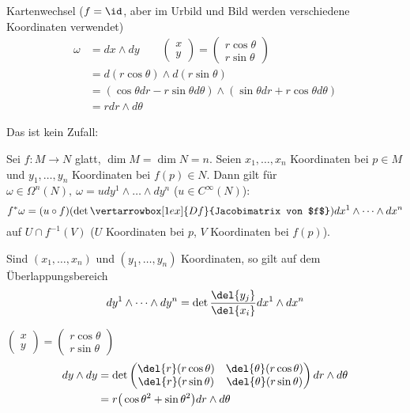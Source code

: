 \begin{exmp*}
	Kartenwechsel ($ f = \id $, aber im Urbild und Bild werden verschiedene Koordinaten verwendet)
	\begin{align*}
		\omega &= dx \wedge dy \qquad \begin{pmatrix}
			x\\y
		\end{pmatrix} = \begin{pmatrix}
		r\cos\theta\\r\sin\theta
	\end{pmatrix}\\
			&= d(r\cos\theta) \wedge d(r\sin\theta) \\
			&= (\cos\theta dr - r\sin \theta d \theta) \wedge (\sin\theta dr + r\cos\theta d \theta)\\
			&= rdr \wedge d\theta
	\end{align*}
\end{exmp*}

Das ist kein Zufall:

\begin{lem}
	Sei $ f: M \to N $ glatt, $ \dim M = \dim N = n $. Seien $ x_1,\dotsc,x_n $ Koordinaten bei $p \in M$ und $ y_1,\dotsc,y_n $ Koordinaten bei $ f(p) \in N $. Dann gilt für $ \omega \in \Omega^n(N),\ \omega = u dy^1 \wedge \dots \wedge dy^n $ ($u \in C^\infty(N)$):
	\[ f^*\omega = (u \circ f)(\det \vertarrowbox[1ex]{Df}{Jacobimatrix von $f$}) dx^1 \wedge \dots \wedge dx^n \]
	auf $ U \cap f^{-1}(V) $ ($U$ Koordinaten bei $p$, $V$ Koordinaten bei $f(p)$).
\end{lem}

\begin{cor*}
	Sind $ (x_1,\dotsc,x_n) $ und $ (y_1,\dotsc,y_n) $ Koordinaten, so gilt auf dem Überlappungsbereich
	\[ dy^1 \wedge \dots \wedge dy^n = \det \frac{\del{y_j}}{\del{x_i}} dx^1 \wedge dx^n \]
\end{cor*}

\begin{exmp*}
	$ \begin{pmatrix}
		x\\y
	\end{pmatrix} = \begin{pmatrix}
		r\cos\theta\\r\sin\theta
	\end{pmatrix} $
	\begin{align*}
		dy \wedge dy &= \det \begin{pmatrix}
			\del{r}(r\cos\theta) & \del{\theta}(r\cos\theta)\\
			\del{r}(r\sin\theta) & \del{\theta}(r\sin\theta)
		\end{pmatrix} dr \wedge d\theta\\
		&= r\big(\cos\theta^2 + \sin\theta^2\big) dr \wedge d\theta
	\end{align*}
\end{exmp*}

